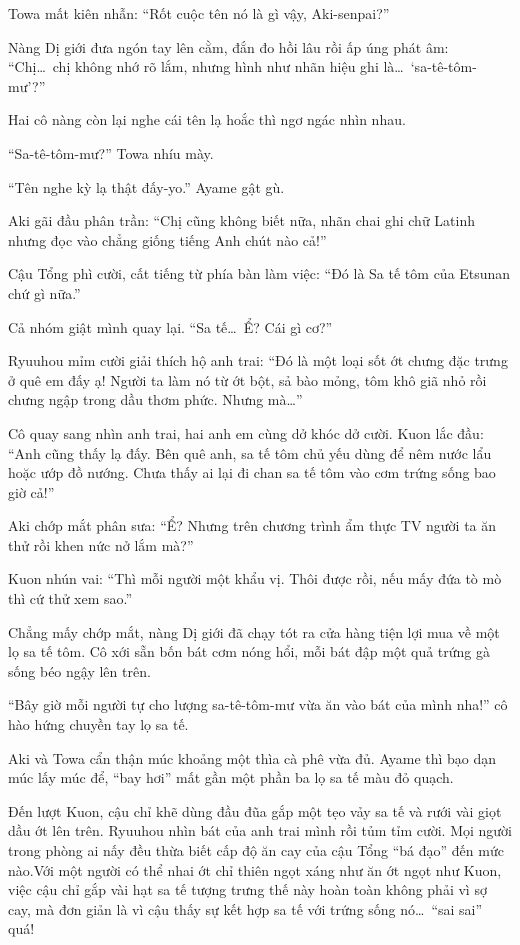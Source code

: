 \documentclass[../main.tex]{subfiles}
\begin{document}
Towa mất kiên nhẫn: ``Rốt cuộc tên nó là gì vậy, Aki-senpai?''

Nàng Dị giới đưa ngón tay lên cằm, đắn đo hồi lâu rồi ấp úng phát âm: ``Chị\dots\ chị không nhớ rõ lắm, nhưng hình như nhãn hiệu ghi là\dots\ `sa-tê-tôm-mư'?''

Hai cô nàng còn lại nghe cái tên lạ hoắc thì ngơ ngác nhìn nhau.

``Sa-tê-tôm-mư?'' Towa nhíu mày.

``Tên nghe kỳ lạ thật đấy-yo.'' Ayame gật gù.

Aki gãi đầu phân trần: ``Chị cũng không biết nữa, nhãn chai ghi chữ Latinh nhưng đọc vào chẳng giống tiếng Anh chút nào cả!''

Cậu Tổng phì cười, cất tiếng từ phía bàn làm việc: ``Đó là Sa tế tôm của Etsunan chứ gì nữa.''

Cả nhóm giật mình quay lại. ``Sa tế\dots\ Ể? Cái gì cơ?''

Ryuuhou mỉm cười giải thích hộ anh trai: ``Đó là một loại sốt ớt chưng đặc trưng ở quê em đấy ạ! Người ta làm nó từ ớt bột, sả bào mỏng, tôm khô giã nhỏ rồi chưng ngập trong dầu thơm phức. Nhưng mà\dots''

Cô quay sang nhìn anh trai, hai anh em cùng dở khóc dở cười. Kuon lắc đầu: ``Anh cũng thấy lạ đấy. Bên quê anh, sa tế tôm chủ yếu dùng để nêm nước lẩu hoặc ướp đồ nướng. Chưa thấy ai lại đi chan sa tế tôm vào cơm trứng sống bao giờ cả!''

Aki chớp mắt phân sưa: ``Ể? Nhưng trên chương trình ẩm thực TV người ta ăn thử rồi khen nức nở lắm mà?''

Kuon nhún vai: ``Thì mỗi người một khẩu vị. Thôi được rồi, nếu mấy đứa tò mò thì cứ thử xem sao.''

Chẳng mấy chớp mắt, nàng Dị giới đã chạy tót ra cửa hàng tiện lợi mua về một lọ sa tế tôm. Cô xới sẵn bốn bát cơm nóng hổi, mỗi bát đập một quả trứng gà sống béo ngậy lên trên.

``Bây giờ mỗi người tự cho lượng sa-tê-tôm-mư vừa ăn vào bát của mình nha!'' cô hào hứng chuyền tay lọ sa tế.

Aki và Towa cẩn thận múc khoảng một thìa cà phê vừa đủ. Ayame thì bạo dạn múc lấy múc để, ``bay hơi'' mất gần một phần ba lọ sa tế màu đỏ quạch.

Đến lượt Kuon, cậu chỉ khẽ dùng đầu đũa gắp một tẹo vảy sa tế và rưới vài giọt dầu ớt lên trên. Ryuuhou nhìn bát của anh trai mình rồi tủm tỉm cười. Mọi người trong phòng ai nấy đều thừa biết cấp độ ăn cay của cậu Tổng ``bá đạo'' đến mức nào.Với một người có thể nhai ớt chỉ thiên ngọt xáng như ăn ớt ngọt như Kuon, việc cậu chỉ gắp vài hạt sa tế tượng trưng thế này hoàn toàn không phải vì sợ cay, mà đơn giản là vì cậu thấy sự kết hợp sa tế với trứng sống nó\dots\ ``sai sai'' quá!
\end{document}
